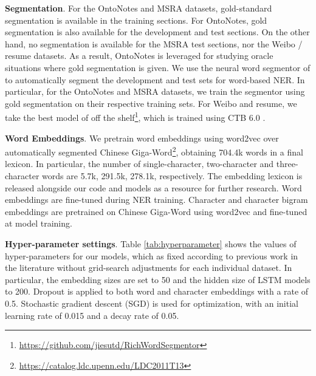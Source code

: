 \documentclass[11pt,a4paper]{article}
\begin{document}
\begin{CJK*}{UTF8}{gbsn}
\textbf{Segmentation}. For the OntoNotes and MSRA datasets, gold-standard segmentation is available in the training sections. For OntoNotes, gold segmentation is also available for the development and test sections.  On the other hand, no segmentation is available for the MSRA test sections, nor the Weibo / resume datasets. As a result, OntoNotes is leveraged for studying oracle situations where gold segmentation is given. We use the neural word segmentor of \citet{yang-zhang-dong:2017:Long} to automatically segment the development and test sets for word-based NER. In particular, for the OntoNotes and MSRA datasets, we train the segmentor using gold segmentation on their respective training sets. For Weibo and resume, we take the best model of \citet{yang-zhang-dong:2017:Long} off the shelf\footnote{\url{https://github.com/jiesutd/RichWordSegmentor}}, which is trained using CTB 6.0 \cite{xue2005penn}.

\textbf{Word Embeddings}. We pretrain word embeddings using word2vec \cite{mikolov2013distributed} over automatically segmented Chinese Giga-Word\footnote{\url{https://catalog.ldc.upenn.edu/LDC2011T13}}, obtaining 704.4k words in a final lexicon. In particular, the number of single-character, two-character and three-character words are 5.7k, 291.5k, 278.1k, respectively. The embedding lexicon is released alongside our code and models as a resource for further research. Word embeddings are fine-tuned during NER training. Character and character bigram embeddings are pretrained on Chinese Giga-Word using word2vec and fine-tuned at model training. 


\textbf{Hyper-parameter settings}. Table \ref{tab:hyperparameter} shows the values of hyper-parameters for our models, which as fixed according to previous work in the literature without grid-search adjustments for each individual dataset. In particular, the embedding sizes are set to 50 and the hidden size of LSTM models to 200. Dropout \cite{srivastava2014dropout} is applied to both word and character embeddings with a rate of 0.5. Stochastic gradient descent (SGD) is used for optimization, with an initial learning rate of 0.015 and a decay rate of 0.05.


\begin{table}[!tp]
\begin{center}
\end{center}
\caption{Hyper-parameter values.}
\label{tab:hyperparameter}
\end{table}


\end{CJK*}
\end{document}
